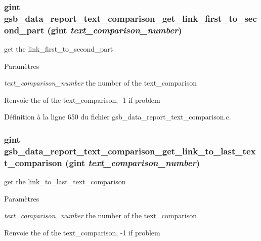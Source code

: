 \subsubsection[{gsb\_\-data\_\-report\_\-text\_\-comparison\_\-get\_\-link\_\-first\_\-to\_\-second\_\-part}]{\setlength{\rightskip}{0pt plus 5cm}gint gsb\_\-data\_\-report\_\-text\_\-comparison\_\-get\_\-link\_\-first\_\-to\_\-second\_\-part (gint {\em text\_\-comparison\_\-number})}\label{gsb__data__report__text__comparison_8h_a8d68df97e25aace4a4809dd9f96819ab}
get the link\_\-first\_\-to\_\-second\_\-part


\begin{DoxyParams}{Paramètres}
\item[{\em text\_\-comparison\_\-number}]the number of the text\_\-comparison\end{DoxyParams}
\begin{DoxyReturn}{Renvoie}
the of the text\_\-comparison, -\/1 if problem 
\end{DoxyReturn}


Définition à la ligne 650 du fichier gsb\_\-data\_\-report\_\-text\_\-comparison.c.

\subsubsection[{gsb\_\-data\_\-report\_\-text\_\-comparison\_\-get\_\-link\_\-to\_\-last\_\-text\_\-comparison}]{\setlength{\rightskip}{0pt plus 5cm}gint gsb\_\-data\_\-report\_\-text\_\-comparison\_\-get\_\-link\_\-to\_\-last\_\-text\_\-comparison (gint {\em text\_\-comparison\_\-number})}\label{gsb__data__report__text__comparison_8h_a7fd2e0a0543f8b47fd26394c8924f94d}
get the link\_\-to\_\-last\_\-text\_\-comparison


\begin{DoxyParams}{Paramètres}
\item[{\em text\_\-comparison\_\-number}]the number of the text\_\-comparison\end{DoxyParams}
\begin{DoxyReturn}{Renvoie}
the of the text\_\-comparison, -\/1 if problem 
\end{DoxyReturn}


